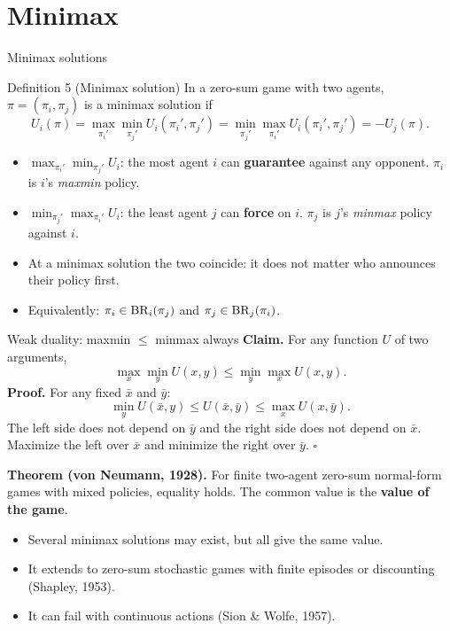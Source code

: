 \documentclass[aspectratio=169,11pt]{beamer}
\begin{document}
\section{Minimax}

\begin{frame}{Minimax solutions}
  \begin{block}{Definition 5 (Minimax solution)}
    In a zero-sum game with two agents, $\pi = (\pi_i, \pi_j)$ is a minimax solution if
    \[
      U_i(\pi) = \max_{\pi_i'} \min_{\pi_j'} U_i(\pi_i', \pi_j') = \min_{\pi_j'} \max_{\pi_i'} U_i(\pi_i', \pi_j') = -U_j(\pi).
    \]
  \end{block}
  \begin{itemize}
    \item $\max_{\pi_i'} \min_{\pi_j'} U_i$: the most agent $i$ can \textbf{guarantee} against any opponent. $\pi_i$ is $i$'s \emph{maxmin} policy.
    \item $\min_{\pi_j'} \max_{\pi_i'} U_i$: the least agent $j$ can \textbf{force} on $i$. $\pi_j$ is $j$'s \emph{minmax} policy against $i$.
    \item At a minimax solution the two coincide: it does not matter who announces their policy first.
    \item Equivalently: $\pi_i \in \operatorname{BR}_i(\pi_j)$ and $\pi_j \in \operatorname{BR}_j(\pi_i)$.
  \end{itemize}
\end{frame}

\begin{frame}{Weak duality: maxmin $\le$ minmax always}
  \textbf{Claim.} For any function $U$ of two arguments,
  \[
    \max_{x} \min_{y} U(x, y) \le \min_{y} \max_{x} U(x, y).
  \]
  \textbf{Proof.} For any fixed $\bar x$ and $\bar y$:
  \[
    \min_{y} U(\bar x, y) \le U(\bar x, \bar y) \le \max_{x} U(x, \bar y).
  \]
  The left side does not depend on $\bar y$ and the right side does not depend on $\bar x$. Maximize the left over $\bar x$ and minimize the right over $\bar y$. \hfill $\square$
  \bigskip

  \textbf{Theorem (von Neumann, 1928).} For finite two-agent zero-sum normal-form games with mixed policies, equality holds. The common value is the \textbf{value of the game}.
  \begin{itemize}
    \item Several minimax solutions may exist, but all give the same value.
    \item It extends to zero-sum stochastic games with finite episodes or discounting (Shapley, 1953).
    \item It can fail with continuous actions (Sion \& Wolfe, 1957).
  \end{itemize}
\end{frame}
\end{document}
